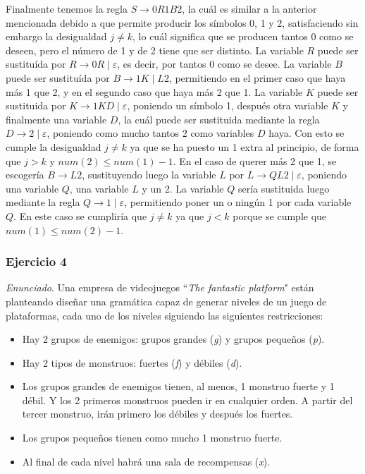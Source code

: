 \documentclass[11pt,a4paper]{article}
\newcommand{\enu}{\textit{Enunciado}}
\begin{document}
		Finalmente tenemos la regla $S \rightarrow 0R1B2$, la cuál es similar a la anterior mencionada debido
		a que permite producir los símbolos 0, 1 y 2, satisfaciendo sin embargo la desigualdad $j \neq k$, lo
		cuál significa que se producen tantos 0 como se deseen, pero el número de 1 y de 2 tiene que ser
		distinto. La variable $R$ puede ser sustituída por $R \rightarrow 0R \; | \; \varepsilon$, es decir,
		por tantos 0 como se desee. La variable $B$ puede ser sustituída por $B \rightarrow 1K \; | \; L2$,
		permitiendo en el primer caso que haya más 1 que 2, y en el segundo caso que haya más 2 que 1.
		La variable $K$ puede ser sustituida por $K \rightarrow 1KD \; | \; \varepsilon$, poniendo un símbolo
		1, después otra variable $K$ y finalmente una variable $D$, la cuál puede ser sustituida mediante la
		regla $D \rightarrow 2 \; | \; \varepsilon$, poniendo como mucho tantos 2 como variables $D$ haya. Con
		esto se cumple la desigualdad $j \neq k$ ya que se ha puesto un 1 extra al principio, de forma que
		$j > k$ y $num(2) \leq num(1) - 1$. En el caso de querer más 2 que 1, se escogería $B \rightarrow L2$,
		sustituyendo luego la variable $L$ por $L \rightarrow QL2 \; | \; \varepsilon$, poniendo una variable
		$Q$, una variable $L$ y un 2. La variable $Q$ sería sustituida luego mediante la regla $Q \rightarrow 1
		\; | \; \varepsilon$, permitiendo poner un o ningún 1 por cada variable $Q$. En este caso se cumpliría
		que $j \neq k$ ya que $j < k$ porque se cumple que $num(1) \leq num(2) - 1$.
		
		
		\subsubsection{Ejercicio 4}
		\enu. Una empresa de videojuegos ``\textit{The fantastic platform}" están planteando diseñar
		una gramática capaz de generar niveles de un juego de plataformas, cada uno de los niveles
		siguiendo las siguientes restricciones:
		
		\begin{itemize}[noitemsep]
			\item Hay 2 grupos de enemigos: grupos grandes (\textit{g}) y grupos pequeños (\textit{p}).
			\item Hay 2 tipos de monstruos: fuertes (\textit{f}) y débiles (\textit{d}).
			\item Los grupos grandes de enemigos tienen, al menos, 1 monstruo fuerte y 1 débil.
				Y los 2 primeros monstruos pueden ir en cualquier orden. A partir del tercer
				monstruo, irán primero los débiles y después los fuertes.
			\item Los grupos pequeños tienen como mucho 1 monstruo fuerte.
			\item Al final de cada nivel habrá una sala de recompensas (\textit{x}).
		\end{itemize}
	
\end{document}
